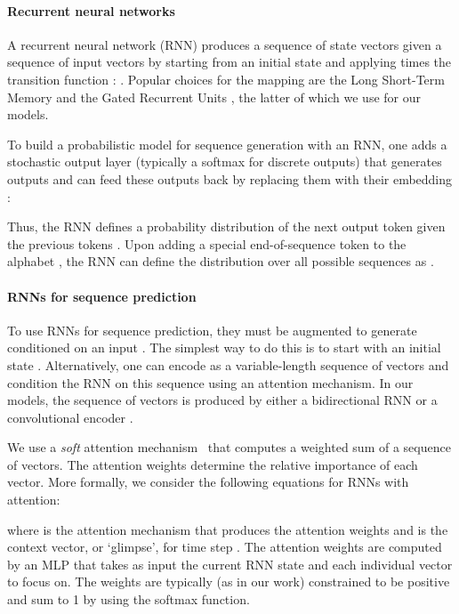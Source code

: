 \documentclass{article} \usepackage{iclr2017_conference,times}
\begin{document}
\paragraph{Recurrent neural networks}

A recurrent neural network (RNN) produces a sequence of state vectors  given a sequence of input vectors  by
starting from an initial  state and applying  times the transition
function : . Popular choices for the mapping  are the Long Short-Term Memory \citep{hochreiter1997long} and the Gated
Recurrent Units \citep{cho2014learning}, the latter of which we use for our models. 

To build a probabilistic model for sequence generation with an RNN,
one adds a stochastic output layer  (typically a softmax for discrete outputs)
that generates outputs  
and can feed these outputs back by replacing them with their embedding :
    


Thus, the RNN defines a probability distribution 
of the next output token  given the previous tokens .
Upon adding a special end-of-sequence token  to the alphabet
, the RNN can define the distribution  over all possible
sequences as .

\paragraph{RNNs for sequence prediction}
To use RNNs for sequence prediction, they must be augmented 
to generate  conditioned on an input . The simplest way to do this
is to start with an initial state  
\citep{sutskever2014sequence,cho2014learning}. Alternatively, one can 
encode  as a variable-length sequence of vectors  and condition
the RNN on this sequence using an attention mechanism.
In our models, the sequence of vectors is produced by either a bidirectional RNN
\citep{schuster1997bidirectional} or a convolutional encoder \citep{rush2015neural}.

We use a \emph{soft} attention mechanism~\citep{bahdanau2015neural} that computes a weighted sum
of a sequence of vectors. The attention weights
determine the relative importance of each vector.
More formally, we consider the following equations for RNNs with attention:
   
where  is the attention mechanism that produces the attention weights
 and  is the context vector, or `glimpse', for time step .
The attention weights are computed by an MLP that takes as input the current RNN
state and each individual vector to focus on. The weights are typically (as in
our work) constrained to be positive and sum to 1 by using the softmax function.
\end{document}
